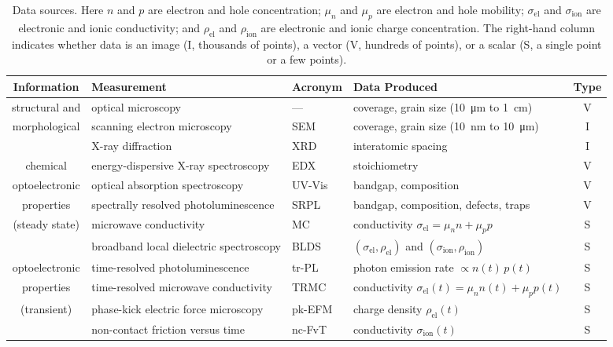 \documentclass[../main.tex]{subfiles}
\begin{document}
\sloppy

\begin{table}
\small
\centering
\setlength{\tabcolsep}{4pt}
\begin{tabular}{clllc}
\toprule
\textbf{Information} & \textbf{Measurement} & \textbf{Acronym} & \textbf{Data Produced} & \textbf{Type} \\
\midrule
structural and & optical microscopy & --- & coverage, grain size (\SI{10}{\micro\meter} to \SI{1}{\centi\meter}) & V \\
 morphological  & scanning electron microscopy & SEM & coverage, grain size (\SI{10}{\nano\meter} to \SI{10}{\micro\meter}) & I \\
 & X-ray diffraction & XRD & interatomic spacing & I \\ \midrule
 
chemical & energy-dispersive X-ray spectroscopy & EDX & stoichiometry & V \\ \midrule
 
 optoelectronic & optical absorption spectroscopy & UV-Vis &  bandgap, composition & V \\ 
 properties & spectrally resolved photoluminescence & SRPL & bandgap, composition, defects, traps & V \\
  (steady state) & microwave conductivity & MC & conductivity $\sigma_{\mathrm{el}} = \mu_n n + \mu_p  p$ & S \\
  & broadband local dielectric spectroscopy & BLDS & $(\sigma_{\mathrm{el}}, \rho_{\mathrm{el}})$ and $(\sigma_{\mathrm{ion}}, \rho_{\mathrm{ion}})$ & S \\ \midrule

optoelectronic & time-resolved photoluminescence & tr-PL & photon emission rate $\propto n(t) \, p(t)$ & S \\
properties  & time-resolved microwave conductivity & TRMC & conductivity $\sigma_{\mathrm{el}}(t) = \mu_n n(t) + \mu_p  p(t)$ & S \\
 (transient)  & phase-kick electric force microscopy & pk-EFM & charge density $\rho_{\mathrm{el}}(t)$ & S \\
    & non-contact friction versus time & nc-FvT & conductivity $\sigma_{\mathrm{ion}}(t)$ & S \\
  \bottomrule
\end{tabular}
\caption{Data sources.  Here 
  $n$ and $p$ are electron and hole concentration;
  $\mu_n$ and $\mu_p$ are electron and hole mobility;
  $\sigma_{\mathrm{el}}$ and $\sigma_{\mathrm{ion}}$ are electronic and ionic conductivity; and  
  $\rho_{\mathrm{el}}$ and $\rho_{\mathrm{ion}}$ are electronic and ionic charge concentration.
  The right-hand column indicates whether data is an image (I, thousands of points), a vector (V, hundreds of points), or a scalar (S, a single point or a few points).}
\label{table:sources}
\end{table}
\end{document}
